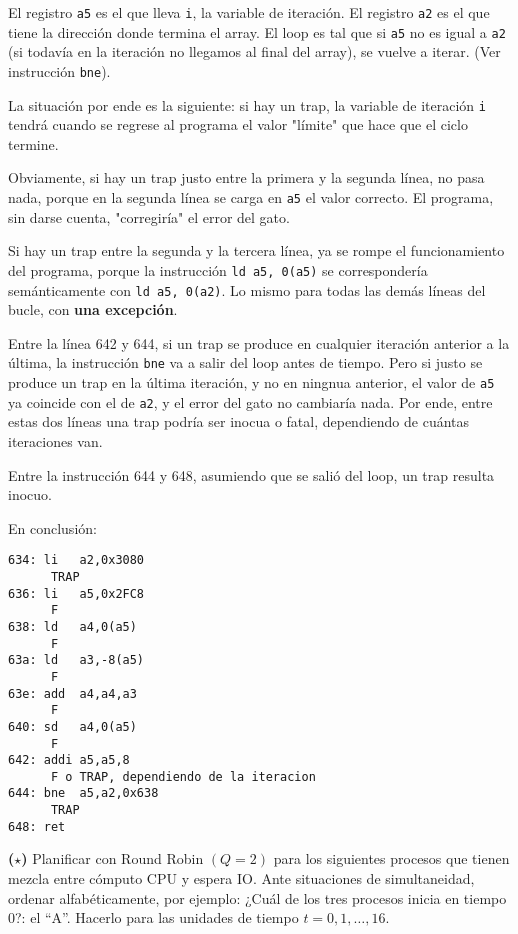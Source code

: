 \documentclass[12pt]{article}
\theoremstyle{definition}
\begin{document}
El registro \texttt{a5} es el que lleva \texttt{i}, la variable de iteración. El
registro \texttt{a2} es el que tiene la dirección donde termina el array. El
loop es tal que si \texttt{a5} no es igual a \texttt{a2} (si todavía en la
iteración no llegamos al final del array), se vuelve a iterar. (Ver instrucción
\texttt{bne}).

La situación por ende es la siguiente: si hay un trap, la variable de iteración
\texttt{i} tendrá cuando se regrese al programa el valor "límite" que hace que
el ciclo termine.

Obviamente, si hay un trap justo entre la primera y la segunda línea, no pasa
nada, porque en la segunda línea se carga en \texttt{a5} el valor correcto. El
programa, sin darse cuenta, "corregiría" el error del gato.

Si hay un trap entre la segunda y la tercera línea, ya se rompe el
funcionamiento del programa, porque la instrucción \texttt{ld a5, 0(a5)} se
correspondería semánticamente con \texttt{ld a5, 0(a2)}. Lo mismo para todas las
demás líneas del bucle, con \textbf{una excepción}.

Entre la línea 642 y 644, si un trap se produce en cualquier iteración anterior
a la última, la instrucción \texttt{bne} va a salir del loop antes de tiempo.
Pero si justo se produce un trap en la última iteración, y no en ningnua
anterior, el valor de \texttt{a5} ya coincide con el de \texttt{a2}, y el error
del gato no cambiaría nada. Por ende, entre estas dos líneas una trap podría ser
inocua o fatal, dependiendo de cuántas iteraciones van. 

Entre la instrucción 644 y 648, asumiendo que se salió del loop, un trap resulta
inocuo. 

En conclusión:



\medskip

\vspace{0.8cm}

\begin{lstlisting}[style=riscv]
634: li   a2,0x3080
      TRAP 
636: li   a5,0x2FC8
      F
638: ld   a4,0(a5)
      F
63a: ld   a3,-8(a5)
      F
63e: add  a4,a4,a3
      F
640: sd   a4,0(a5)
      F
642: addi a5,a5,8
      F o TRAP, dependiendo de la iteracion
644: bne  a5,a2,0x638
      TRAP
648: ret
\end{lstlisting}




\pagebreak 

\begin{shaded}
    \textbf{($\star$)} Planificar con Round Robin $(Q = 2)$ para los siguientes
    procesos que tienen mezcla entre cómputo CPU y espera IO. Ante situaciones
    de simultaneidad, ordenar alfabéticamente, por ejemplo: ¿Cuál de los tres
    procesos inicia en tiempo 0?: el ``A''. Hacerlo para las unidades de tiempo
    $t = 0, 1, \ldots, 16$.
\end{shaded}
\end{document}
